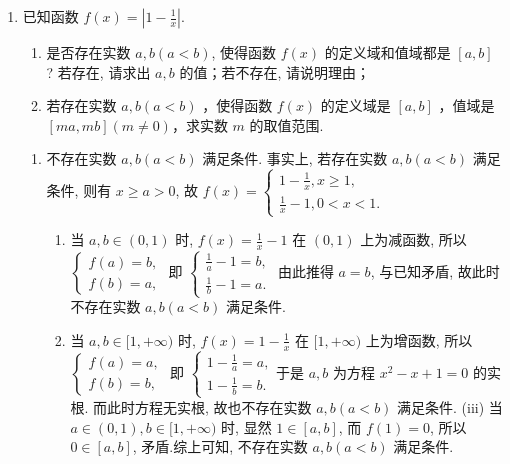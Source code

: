 \begin{enumerate}
\item 已知函数 $f(x)=\left|1-\frac{1}{x}\right|$.
\begin{enumerate}
\item 是否存在实数 $a, b(a<b)$, 使得函数 $f(x)$ 的定义域和值域都是 $[a, b]$ ? 若存在, 请求出 $a, b$ 的值；若不存在, 请说明理由；
\item 若存在实数 $a, b(a<b)$ ，使得函数 $f(x)$ 的定义域是 $[a, b]$ ，值域是 $[m a, m b](m \neq 0)$，求实数 $m$ 的取值范围.
\end{enumerate}
\begin{jieda}
\begin{enumerate}
\item 不存在实数 $a, b(a<b)$ 满足条件. 事实上, 若存在实数 $a, b(a<b)$ 满足条件,
则有 $x \geqslant a>0$, 故 $f(x)=\left\{\begin{array}{l}1-\frac{1}{x}, x \geqslant 1, \\ \frac{1}{x}-1,0<x<1 .\end{array}\right.$
\begin{enumerate}
\item 当 $a, b \in(0,1)$ 时, $f(x)=\frac{1}{x}-1$ 在 $(0,1)$ 上为减函数, 所以 $\left\{\begin{array}{l}f(a)=b, \\ f(b)=a,\end{array}\right.$ 即 $\left\{\begin{array}{l}\frac{1}{a}-1=b, \\ \frac{1}{b}-1=a .\end{array}\right.$
由此推得 $a=b$, 与已知矛盾, 故此时不存在实数 $a, b(a<b)$ 满足条件.
\item 当 $a, b \in[1,+\infty)$ 时, $f(x)=1-\frac{1}{x}$ 在 $[1,+\infty)$ 上为增函数, 所以 $\left\{\begin{array}{l}f(a)=a, \\ f(b)=b,\end{array}\right.$ 即 $\left\{\begin{array}{l}1-\frac{1}{a}=a, \\ 1-\frac{1}{b}=b .\end{array}\right.$于是 $a, b$ 为方程 $x^2-x+1=0$ 的实根. 而此时方程无实根, 故也不存在实数 $a, b(a<b)$ 满足条件. (iii) 当 $a \in(0,1), b \in[1,+\infty)$ 时, 显然 $1 \in[a, b]$, 而 $f(1)=0$, 所以 $0 \in[a, b]$, 矛盾.综上可知, 不存在实数 $a, b(a<b)$ 满足条件.
\end{enumerate}


\end{enumerate}
\end{jieda}
\end{enumerate}
